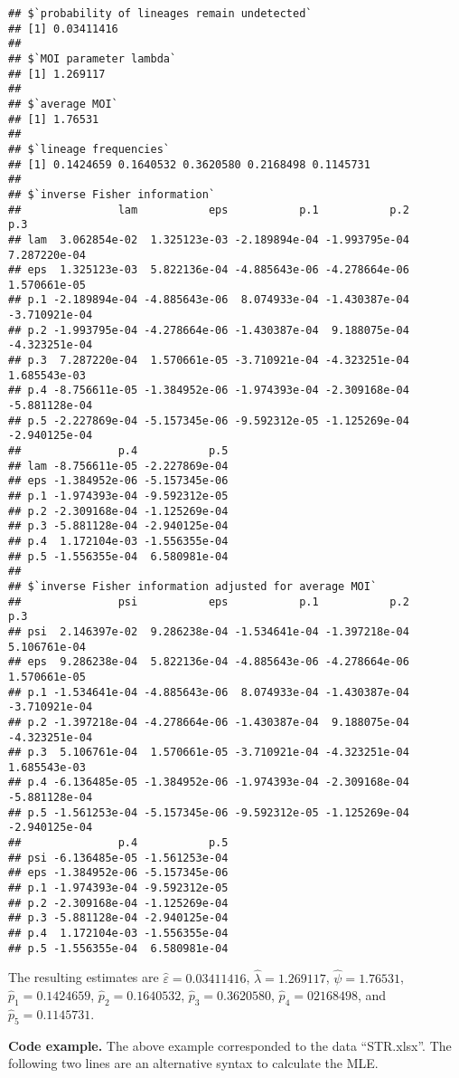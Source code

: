 \documentclass[
]{article}
\begin{document}
\begin{verbatim}
## $`probability of lineages remain undetected`
## [1] 0.03411416
## 
## $`MOI parameter lambda`
## [1] 1.269117
## 
## $`average MOI`
## [1] 1.76531
## 
## $`lineage frequencies`
## [1] 0.1424659 0.1640532 0.3620580 0.2168498 0.1145731
## 
## $`inverse Fisher information`
##               lam           eps           p.1           p.2           p.3
## lam  3.062854e-02  1.325123e-03 -2.189894e-04 -1.993795e-04  7.287220e-04
## eps  1.325123e-03  5.822136e-04 -4.885643e-06 -4.278664e-06  1.570661e-05
## p.1 -2.189894e-04 -4.885643e-06  8.074933e-04 -1.430387e-04 -3.710921e-04
## p.2 -1.993795e-04 -4.278664e-06 -1.430387e-04  9.188075e-04 -4.323251e-04
## p.3  7.287220e-04  1.570661e-05 -3.710921e-04 -4.323251e-04  1.685543e-03
## p.4 -8.756611e-05 -1.384952e-06 -1.974393e-04 -2.309168e-04 -5.881128e-04
## p.5 -2.227869e-04 -5.157345e-06 -9.592312e-05 -1.125269e-04 -2.940125e-04
##               p.4           p.5
## lam -8.756611e-05 -2.227869e-04
## eps -1.384952e-06 -5.157345e-06
## p.1 -1.974393e-04 -9.592312e-05
## p.2 -2.309168e-04 -1.125269e-04
## p.3 -5.881128e-04 -2.940125e-04
## p.4  1.172104e-03 -1.556355e-04
## p.5 -1.556355e-04  6.580981e-04
## 
## $`inverse Fisher information adjusted for average MOI`
##               psi           eps           p.1           p.2           p.3
## psi  2.146397e-02  9.286238e-04 -1.534641e-04 -1.397218e-04  5.106761e-04
## eps  9.286238e-04  5.822136e-04 -4.885643e-06 -4.278664e-06  1.570661e-05
## p.1 -1.534641e-04 -4.885643e-06  8.074933e-04 -1.430387e-04 -3.710921e-04
## p.2 -1.397218e-04 -4.278664e-06 -1.430387e-04  9.188075e-04 -4.323251e-04
## p.3  5.106761e-04  1.570661e-05 -3.710921e-04 -4.323251e-04  1.685543e-03
## p.4 -6.136485e-05 -1.384952e-06 -1.974393e-04 -2.309168e-04 -5.881128e-04
## p.5 -1.561253e-04 -5.157345e-06 -9.592312e-05 -1.125269e-04 -2.940125e-04
##               p.4           p.5
## psi -6.136485e-05 -1.561253e-04
## eps -1.384952e-06 -5.157345e-06
## p.1 -1.974393e-04 -9.592312e-05
## p.2 -2.309168e-04 -1.125269e-04
## p.3 -5.881128e-04 -2.940125e-04
## p.4  1.172104e-03 -1.556355e-04
## p.5 -1.556355e-04  6.580981e-04
\end{verbatim}

The resulting estimates are \(\hat \varepsilon = 0.03411416\),
\(\hat \lambda=1.269117\), \(\hat \psi = 1.76531\),
\(\hat p_1=0.1424659\), \(\hat p_2=0.1640532\), \(\hat p_3=0.3620580\),
\(\hat p_4=02168498\), and \(\hat p_5=0.1145731\).

\textbf{Code example.} The above example corresponded to the data
``STR.xlsx''. The following two lines are an alternative syntax to
calculate the MLE.
\end{document}
